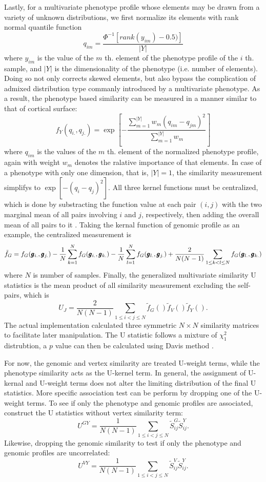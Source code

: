 Lastly, for a multivariate phenotype profile whose elements may be drawn from a variety of unknown distributions, we first normalize its elements with rank normal quantile function
\[ q_{im}=\frac{\Phi^{-1}[rank(y_{im})-0.5)]}{|Y|} \]
where $y_{im}$ is the value of the $m$ th. element of the phenotype profile of the $i$ th. sample, and $|Y|$ is the dimensionality of the phenotype (i.e. number of elements). Doing so not only corrects skewed elements, but also bypass the complication of admixed distribution type commanly introduced by a multivariate phenotype. As a result, the phenotype based similarity can be measured in a manner similar to that of cortical surface:
\[ f_Y(q_{i.},q_{j.}) = \exp{[-\frac{\sum_{m=1}^{|Y|}{w_m(q_{im}-q_{jm})^2}} {\sum_{m=1}^{|Y|}{w_m}}]} \]
where $q_{im}$ is the values of the $m$ th. element of the normalized phenotype profile, again with weight $w_m$ denotes the ralative importance of that elements. In case of a phenotype with only one dimension, that is, $|Y|=1$, the similarity measurement simplifys to $\exp{[-(q_i - q_j)^2]}$.
All three kernel functions must be centralized, which is done by substracting the function value at each pair $(i,j)$ with the two marginal mean of all pairs involving $i$ and $j$, respectively, then adding the overall mean of all pairs to it \cite{HWU}. Taking the kernal function of genomic profile as an example, the centralized measurement is
\[ \tilde{f}_G = f_G(\pmb{g}_{i.}, \pmb{g}_{j.})-\frac{1}{N} \sum_{k=1}^N{f_G(\pmb{g}_{i.}, \pmb{g}_{k.})}-\frac{1}{N}\sum_{l=1}^N{f_G(\pmb{g}_{l.}, \pmb{g}_{j.})}+\frac{2}{N(N-1)}\sum_{1 \le k < l \le N}{f_G(\pmb{g}_{l.}, \pmb{g}_{k.})}\]
where $N$ is number of samples. Finally, the generalized multivariate similarity U statistics is the mean product of all similarity measurement excluding the self-pairs, which is
\[ U_J = \frac{2}{N(N-1)}\sum_{1 \leq i < j \leq N} \tilde{f}_G() \tilde{f}_V() \tilde{f}_Y(). \]
The actual implementation calculated three symmetric $N \times N$ similarity matrices to facilitate later manipulation. The U statistic follows a mixture of $\chi_1^2$ distrubtion, a $p$ value can then be calculated using Davis method \cite{HWU}.

For now, the genomic and vertex similarity are treated U-weight terms, while the phenotype similarity acts as the U-kernel term. In general, the assignment of U-kernal and U-weight terms does not alter the limiting distribution of the final U statistics. More specific association test can be perform by dropping one of the U-weight terms. To see if only the phenotype and genomic profiles are associated, construct the U statistics without vertex similarity term:
\begin{displaymath}
  U^{GY}=\frac{1}{N(N-1)}\sum_{1 \leq i < j \leq N} \tilde{S}_{ij}^{G} \tilde{S}_{ij}^{Y}.
\end{displaymath}
Likewise, dropping the genomic similarity to test if only the phenotype and genomic profiles are uncorrelated:
\begin{displaymath}
  U^{VY}=\frac{1}{N(N-1)}\sum_{1 \leq i < j \leq N} \tilde{S}_{ij}^{V} \tilde{S}_{ij}^{Y}.
\end{displaymath}


